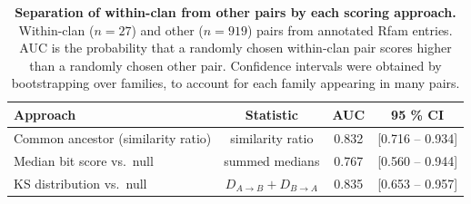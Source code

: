 \begin{table}[htbp]
\centering
\footnotesize
\caption[Comparison of pairwise scoring approaches on Rfam clans]{\textbf{Separation of within-clan from other pairs by each scoring approach.} 
Within-clan ($n = 27$) and other ($n = 919$) pairs from annotated Rfam entries. 
AUC is the probability that a randomly chosen within-clan pair scores higher than a randomly chosen other pair.
Confidence intervals were obtained by bootstrapping over families, to account for each family appearing in many pairs.}
\label{tab:classifier_comparison}
\begin{tabular}{lccc}
\hline
\textbf{Approach} & \textbf{Statistic} & \textbf{AUC} & \textbf{95 \% CI} \\
\hline
Common ancestor (similarity ratio) & similarity ratio & 0.832 & [0.716 -- 0.934] \\
Median bit score vs.\ null & summed medians & 0.767 & [0.560 -- 0.944] \\
KS distribution vs.\ null & $D_{A\rightarrow B} + D_{B\rightarrow A}$ & 0.835 & [0.653 -- 0.957] \\
\hline
\end{tabular}
\end{table}